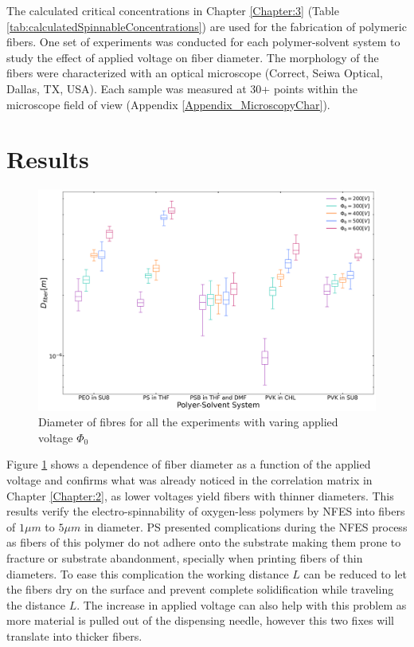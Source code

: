 The calculated critical concentrations in Chapter \ref{Chapter:3} (Table \ref{tab:calculatedSpinnableConcentrations}) are used for the fabrication of polymeric fibers. One set of experiments was conducted for each polymer-solvent system to study the effect of applied voltage on fiber diameter. The morphology of the fibers were characterized with an optical microscope (Correct, Seiwa Optical, Dallas, TX, USA). Each sample was measured at 30+ points within the microscope field of view (Appendix \ref{Appendix_MicroscopyChar}).

\section{Results}

\begin{figure}[!th]
\centering
\includegraphics[width=\textwidth]{./Figures/boxplotsFiberDiameter.png}
\decoRule
\caption[Diameter of fibres for all the experiments]{Diameter of fibres for all the experiments with varing applied voltage $\Phi_0$}
\label{fig:boxplotsFiberDiameter}
\end{figure}

Figure \ref{fig:boxplotsFiberDiameter} shows a dependence of fiber diameter as a function of the applied voltage and confirms what was already noticed in the correlation matrix in Chapter \ref{Chapter:2}, as lower voltages yield fibers with thinner diameters. This results verify the electro-spinnability of oxygen-less polymers by NFES into fibers of $1 \mu m$ to $5 \mu m$ in diameter. PS presented complications during the NFES process as fibers of this polymer do not adhere onto the substrate making them prone to fracture or substrate abandonment, specially when printing fibers of thin diameters. To ease this complication the working distance $L$ can be reduced to let the fibers dry on the surface and prevent complete solidification while traveling the distance $L$. The increase in applied voltage can also help with this problem as more material is pulled out of the dispensing needle, however this two fixes will translate into thicker fibers.

